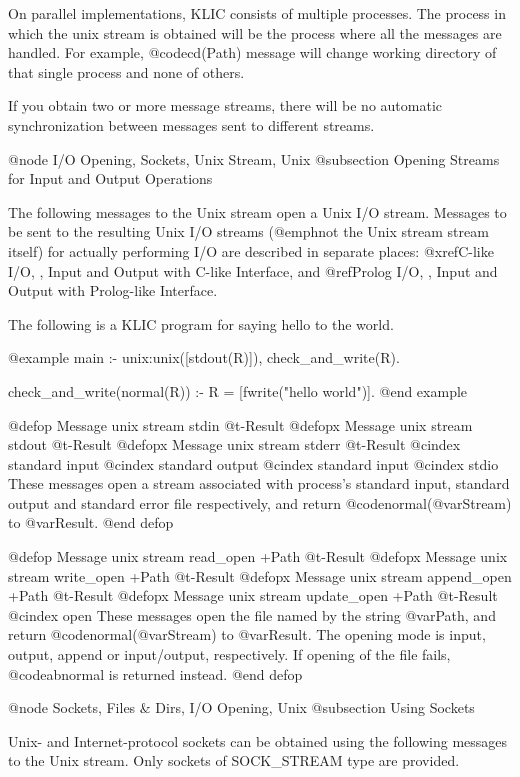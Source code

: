 {{{{On parallel implementations, KLIC consists of multiple processes.  The
process in which the unix stream is obtained will be the process
where all the messages are handled.  For example, @code{cd(Path)}
message will change working directory of that single process and none of
others.

If you obtain two or more message streams, there will be no automatic
synchronization between messages sent to different streams.

@node I/O Opening, Sockets, Unix Stream, Unix
@subsection Opening Streams for Input and Output Operations

The following messages to the Unix stream open a Unix I/O stream.
Messages to be sent to the resulting Unix I/O streams (@emph{not} the
Unix stream stream itself) for actually performing I/O are described in
separate places: @xref{C-like I/O, , Input and Output with C-like
Interface}, and @ref{Prolog I/O, , Input and Output with Prolog-like
Interface}.

The following is a KLIC program for saying hello to the world.

@example
main :- unix:unix([stdout(R)]), check_and_write(R).

check_and_write(normal(R)) :- R = [fwrite("hello world\n")].
@end example

@defop {Message} {unix stream} stdin @t{-}Result
@defopx {Message} {unix stream} stdout @t{-}Result
@defopx {Message} {unix stream} stderr @t{-}Result
@cindex standard input
@cindex standard output
@cindex standard input
@cindex stdio
These messages open a stream associated with process's standard input,
standard output and standard error file respectively, and return
@code{normal(@var{Stream})} to @var{Result}.
@end defop

@defop {Message} {unix stream} read_open +Path @t{-}Result
@defopx {Message} {unix stream} write_open +Path @t{-}Result
@defopx {Message} {unix stream} append_open +Path @t{-}Result
@defopx {Message} {unix stream} update_open +Path @t{-}Result
@cindex open
These messages open the file named by the string @var{Path}, and return
@code{normal(@var{Stream})} to @var{Result}.  The opening mode is input,
output, append or input/output, respectively.  If opening of the file
fails, @code{abnormal} is returned instead.
@end defop

@node Sockets, Files & Dirs, I/O Opening, Unix
@subsection Using Sockets

Unix- and Internet-protocol sockets can be obtained using the following
messages to the Unix stream.  Only sockets of SOCK_STREAM type are
provided.

}}}}
